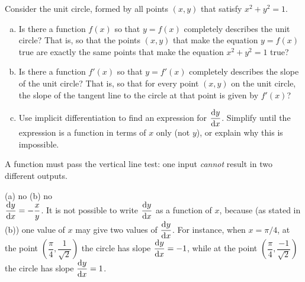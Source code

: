 \begin{question}
Consider the unit circle, formed by all points $(x,y)$ that satisfy $x^2+y^2=1$.
\begin{center}\end{center}
\begin{enumerate}[(a)]
\item Is there a function $f(x)$ so that $y=f(x)$ completely describes the unit circle? That is, so that the points $(x,y)$ that make the equation $y=f(x)$ true are exactly the same points that make the equation $x^2+y^2=1$ true?
\item Is there a function $f'(x)$ so that $y=f'(x)$ completely describes the slope of the unit circle? That is, so that for every point $(x,y)$ on the unit circle, the slope of the tangent line to the circle at that point is given by $f'(x)$?
\item Use implicit differentiation to find an expression for $\ds\diff{y}{x}$. Simplify until the expression is a function in terms of $x$ only (not $y$), or explain why this is impossible.
\end{enumerate}
\end{question}
\begin{hint} A function must pass the vertical line test: one input \emph{cannot} result in two different outputs.
\end{hint}
\begin{answer}
(a) no \qquad (b) no\\
$\ds\diff{y}{x}=-\dfrac{x}{y}$. It is not possible to write $\ds\diff{y}{x}$ as a function of $x$, because (as stated in (b)) one value of $x$ may give two values of $\ds\diff{y}{x}$. For instance, when $x=\pi/4$, at the point $\left(\dfrac{\pi}{4},\dfrac{1}{\sqrt{2}}\right)$ the circle has slope $\ds\diff{y}{x}=-1$, while
at the point $\left(\dfrac{\pi}{4},\dfrac{-1}{\sqrt{2}}\right)$ the circle has slope $\ds\diff{y}{x}=1$.
\end{answer}
